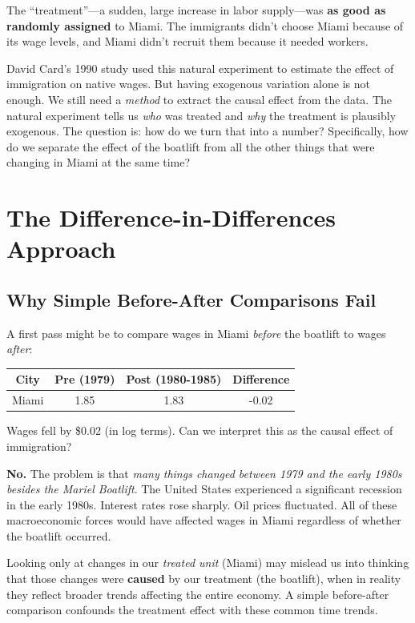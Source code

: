 \documentclass[
  letterpaper,
  DIV=11,
  numbers=noendperiod]{scrreprt}
\newcounter{none} %
\begin{document}
The ``treatment''---a sudden, large increase in labor supply---was
\textbf{as good as randomly assigned} to Miami. The immigrants didn't
choose Miami because of its wage levels, and Miami didn't recruit them
because it needed workers.

David Card's 1990 study used this natural experiment to estimate the
effect of immigration on native wages. But having exogenous variation
alone is not enough. We still need a \emph{method} to extract the causal
effect from the data. The natural experiment tells us \emph{who} was
treated and \emph{why} the treatment is plausibly exogenous. The
question is: how do we turn that into a number? Specifically, how do we
separate the effect of the boatlift from all the other things that were
changing in Miami at the same time?

\section{The Difference-in-Differences
Approach}\label{the-difference-in-differences-approach}

\subsection{Why Simple Before-After Comparisons
Fail}\label{why-simple-before-after-comparisons-fail}

A first pass might be to compare wages in Miami \emph{before} the
boatlift to wages \emph{after}:

{\def\LTcaptype{none} %
\begin{longtable}[]{@{}cccc@{}}
\toprule\noalign{}
City & Pre (1979) & Post (1980-1985) & Difference \\
\midrule\noalign{}
\endhead
\bottomrule\noalign{}
\endlastfoot
Miami & 1.85 & 1.83 & -0.02 \\
\end{longtable}
}

Wages fell by \$0.02 (in log terms). Can we interpret this as the causal
effect of immigration?

\textbf{No.} The problem is that \emph{many things changed between 1979
and the early 1980s besides the Mariel Boatlift}. The United States
experienced a significant recession in the early 1980s. Interest rates
rose sharply. Oil prices fluctuated. All of these macroeconomic forces
would have affected wages in Miami regardless of whether the boatlift
occurred.

Looking only at changes in our \emph{treated unit} (Miami) may mislead
us into thinking that those changes were \textbf{caused} by our
treatment (the boatlift), when in reality they reflect broader trends
affecting the entire economy. A simple before-after comparison confounds
the treatment effect with these common time trends.
\end{document}

